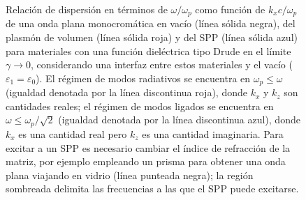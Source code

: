 \begin{figure}[h!]\centering
\vspace*{-.5em}
	\caption{Relación de dispersión en términos de $\omega/\omega_p$ como función de $k_xc/\omega_p$ de una onda plana monocromática en vacío (línea sólida negra), del plasmón de volumen (línea sólida roja) y del SPP (línea sólida azul) para materiales con una función dieléctrica tipo Drude en el límite $\gamma\to 0$, considerando una interfaz entre estos materiales y el vacío ($\varepsilon_1 =\varepsilon_0$). El régimen de modos radiativos se encuentra en $\omega_p\leq\omega$ (igualdad denotada por la línea discontinua roja), donde $k_x$ y $k_z$ son cantidades reales; el régimen de modos ligados se encuentra en $\omega\leq\omega_p/\sqrt{2}$ (igualdad denotada por la línea discontinua azul), donde $k_x$ es una cantidad real pero $k_z$ es una cantidad imaginaria. Para excitar a un SPP es necesario cambiar el índice de refracción de la matriz, por ejemplo empleando un prisma para obtener una onda plana viajando en vidrio (línea punteada negra); la región sombreada delimita las frecuencias a las que el SPP puede excitarse.}
	\label{fig:Relaciones_de_dispersion}
	\end{figure}		

